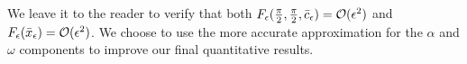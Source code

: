 We leave it to the reader to verify that both 
 $F_\epsilon(\tfrac{\pi}{2},\tfrac{\pi}{2},\bar{c}_{\epsilon})=\mathcal{O}(\epsilon^2)$ and $F_\epsilon(\bar{x}_\epsilon)=\mathcal{O}(\epsilon^2)$.
We choose to use the more accurate approximation 
for the $ \alpha$ and $ \omega $ components to improve our final quantitative results. 














%
%
%
%
%
%
%
%

